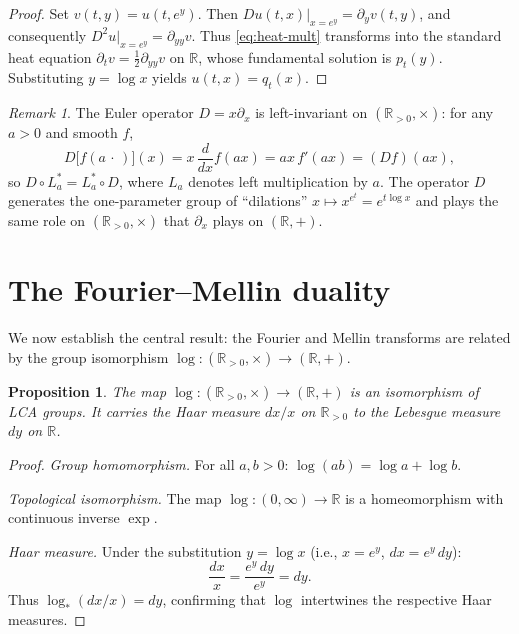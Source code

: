 \documentclass[12pt]{amsart}
\newtheorem{proposition}[theorem]{Proposition}
\theoremstyle{definition}
\theoremstyle{remark}
\newtheorem*{remark}{Remark}
\newcommand{\R}{\mathbb{R}}
\newcommand{\Rpos}{\mathbb{R}_{>0}}
\begin{document}
\begin{proof}
Set $v(t, y) = u(t, e^y)$. Then $Du(t,x)\big|_{x=e^y} = \partial_y v(t,y)$, and consequently $D^2 u\big|_{x=e^y} = \partial_{yy}v$. Thus \eqref{eq:heat-mult} transforms into the standard heat equation $\partial_t v = \frac{1}{2}\partial_{yy}v$ on $\R$, whose fundamental solution is $p_t(y)$. Substituting $y = \log x$ yields $u(t,x) = q_t(x)$.
\end{proof}

\begin{remark}\label{rmk:euler-invariant}
The Euler operator $D = x\partial_x$ is left-invariant on $(\Rpos, \times)$: for any $a > 0$ and smooth $f$,
\[
D\big[f(a\,\cdot\,)\big](x) = x\,\frac{d}{dx}f(ax) = ax\,f'(ax) = (Df)(ax),
\]
so $D \circ L_a^* = L_a^* \circ D$, where $L_a$ denotes left multiplication by $a$. The operator $D$ generates the one-parameter group of ``dilations'' $x \mapsto x^{e^t} = e^{t\log x}$ and plays the same role on $(\Rpos, \times)$ that $\partial_x$ plays on $(\R, +)$.
\end{remark}

\section{The Fourier--Mellin duality}

We now establish the central result: the Fourier and Mellin transforms are related by the group isomorphism $\log : (\Rpos, \times) \to (\R, +)$.

\begin{proposition}\label{prop:log-iso}
The map $\log : (\Rpos, \times) \to (\R, +)$ is an isomorphism of LCA groups. It carries the Haar measure $dx/x$ on $\Rpos$ to the Lebesgue measure $dy$ on $\R$.
\end{proposition}

\begin{proof}
\emph{Group homomorphism.} For all $a, b > 0$: $\log(ab) = \log a + \log b$.

\emph{Topological isomorphism.} The map $\log : (0, \infty) \to \R$ is a homeomorphism with continuous inverse $\exp$.

\emph{Haar measure.} Under the substitution $y = \log x$ (i.e., $x = e^y$, $dx = e^y\, dy$):
\[
\frac{dx}{x} = \frac{e^y\, dy}{e^y} = dy.
\]
Thus $\log_*(dx/x) = dy$, confirming that $\log$ intertwines the respective Haar measures.
\end{proof}
\end{document}
